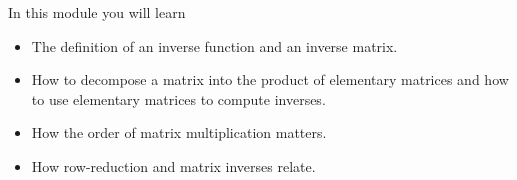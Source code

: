 \documentclass{workbook}
\begin{document}
\begin{module}

	In this module you will learn
	\begin{itemize}
		\item The definition of an inverse function and an inverse matrix.
		\item How to decompose a matrix into the product of elementary matrices and how to use
			elementary matrices to compute inverses.
		\item How the order of matrix multiplication matters.
		\item How row-reduction and matrix inverses relate.
	\end{itemize}

	
	
\end{module}
\end{document}
